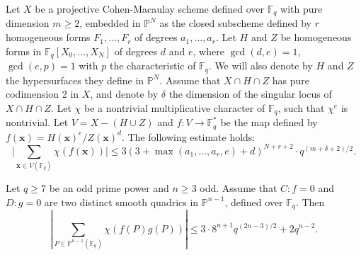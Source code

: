 \documentclass[10pt,a4paper]{amsart}
\newcommand{\F}{\mathbb{F}}
\begin{document}
\begin{lem}[Rojas-Le\'{o}n]\label{lem:RL}
 Let $X$ be a projective Cohen-Macaulay scheme defined over $\F_q$ with pure dimension $m \geq 2$, embedded in $\mathbb{P}^N$ as the closed subscheme defined by $r$ homogeneous forms $F_1, \ldots, F_r$ of degrees $a_1, \ldots, a_r$. Let $H$ and $Z$ be homogeneous forms in $\F_q\left[X_0, \ldots, X_N\right]$ of degrees $d$ and $e$, where $\gcd(d, e)=1$, $\gcd(e, p)=1$ with $p$ the characteristic of $\F_q$. We will also denote by $H$ and $Z$ the hypersurfaces they define in $\mathbb{P}^N$. Assume that $X \cap H \cap Z$ has pure codimension 2 in $X$, and denote by $\delta$ the dimension of the singular locus of $X \cap H \cap Z$. Let $\chi$ be a nontrivial multiplicative character of $\F_q$, such that $\chi^e$ is nontrivial. Let $V=X-(H \cup Z)$ and $f\colon V \rightarrow \F_q^*$ be the map defined by $f(\mathbf{x})=H(\mathbf{x})^e / Z(\mathbf{x})^d$. The following estimate holds:
$$
\bigg|\sum_{\mathbf{x} \in V(\F_q)} \chi(f(\mathbf{x}))\bigg| \leq 3(3+\max \left(a_1, \ldots, a_r, e\right)+d)^{N+r+2} \cdot q^{(m+\delta+2) / 2} .
$$   
\end{lem}

\begin{lem}\label{lem1}
Let $q \geq 7$ be an odd prime power and $n \geq 3$ odd. Assume that $C:f=0$ and $D:g=0$ are two distinct smooth quadrics in $\mathbb{P}^{n-1}$, defined over $\F_q$. Then
$$
\left|\sum_{P\in\mathbb{P}^{n-1}(\F_q)} \chi(f(P) g(P))\right| \leq 3\cdot 8^{n+1} q^{(2n-3)/2} +2q^{n-2}. 
$$ 
\end{lem}
\end{document}
